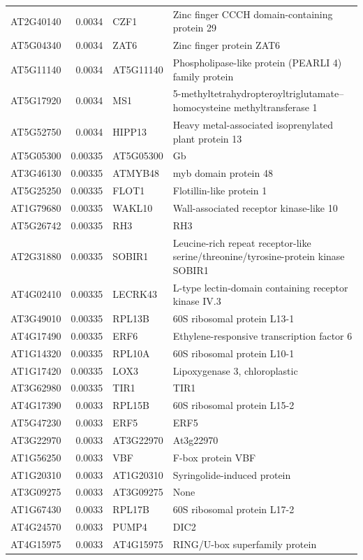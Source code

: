 \documentclass[11pt]{article}
\begin{document}
\begin{center}
\begin{tabular}{lrll}
AT2G40140 & 0.0034 & CZF1 & Zinc finger CCCH domain-containing protein 29\\
AT5G04340 & 0.0034 & ZAT6 & Zinc finger protein ZAT6\\
AT5G11140 & 0.0034 & AT5G11140 & Phospholipase-like protein (PEARLI 4) family protein\\
AT5G17920 & 0.0034 & MS1 & 5-methyltetrahydropteroyltriglutamate--homocysteine methyltransferase 1\\
AT5G52750 & 0.0034 & HIPP13 & Heavy metal-associated isoprenylated plant protein 13\\
AT5G05300 & 0.00335 & AT5G05300 & Gb\\
AT3G46130 & 0.00335 & ATMYB48 & myb domain protein 48\\
AT5G25250 & 0.00335 & FLOT1 & Flotillin-like protein 1\\
AT1G79680 & 0.00335 & WAKL10 & Wall-associated receptor kinase-like 10\\
AT5G26742 & 0.00335 & RH3 & RH3\\
AT2G31880 & 0.00335 & SOBIR1 & Leucine-rich repeat receptor-like serine/threonine/tyrosine-protein kinase SOBIR1\\
AT4G02410 & 0.00335 & LECRK43 & L-type lectin-domain containing receptor kinase IV.3\\
AT3G49010 & 0.00335 & RPL13B & 60S ribosomal protein L13-1\\
AT4G17490 & 0.00335 & ERF6 & Ethylene-responsive transcription factor 6\\
AT1G14320 & 0.00335 & RPL10A & 60S ribosomal protein L10-1\\
AT1G17420 & 0.00335 & LOX3 & Lipoxygenase 3, chloroplastic\\
AT3G62980 & 0.00335 & TIR1 & TIR1\\
AT4G17390 & 0.0033 & RPL15B & 60S ribosomal protein L15-2\\
AT5G47230 & 0.0033 & ERF5 & ERF5\\
AT3G22970 & 0.0033 & AT3G22970 & At3g22970\\
AT1G56250 & 0.0033 & VBF & F-box protein VBF\\
AT1G20310 & 0.0033 & AT1G20310 & Syringolide-induced protein\\
AT3G09275 & 0.0033 & AT3G09275 & None\\
AT1G67430 & 0.0033 & RPL17B & 60S ribosomal protein L17-2\\
AT4G24570 & 0.0033 & PUMP4 & DIC2\\
AT4G15975 & 0.0033 & AT4G15975 & RING/U-box superfamily protein\\

\end{tabular}
\end{center}
\end{document}
